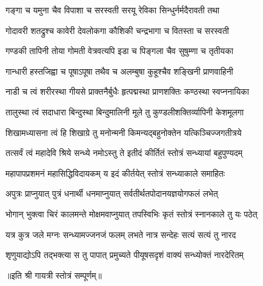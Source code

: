 \twolineshloka
{गङ्गा च यमुना चैव विपाशा च सरस्वती}
{सरयू रेविका सिन्धुर्नर्मदैरावती तथा}

\twolineshloka
{गोदावरी शतद्रुश्च कावेरी देवलोकगा}
{कौशिकी चन्द्रभागा च वितस्ता च सरस्वती}

\twolineshloka
{गण्डकी तापिनी तोया गोमती वेत्रवत्यपि}
{इडा च पिङ्गला चैव सुषुम्णा च तृतीयका}

\twolineshloka
{गान्धारी हस्तजिह्वा च पूषाऽपूषा तथैव च}
{अलम्बुषा कुहूश्चैव शङ्खिनी प्राणवाहिनी}

\twolineshloka
{नाडी च त्वं शरीरस्था गीयसे प्राक्तनैर्बुधैः}
{हृत्पद्मस्था प्राणशक्तिः कण्ठस्था स्वप्ननायिका}

\twolineshloka
{तालुस्था त्वं सदाधारा बिन्दुस्था बिन्दुमालिनी}
{मूले तु कुण्डलीशक्तिर्व्यापिनी केशमूलगा}

\twolineshloka
{शिखामध्यासना त्वं हि शिखाग्रे तु मनोन्मनी}
{किमन्यद्बहुनोक्तेन यत्किञ्चिज्जगतीत्रये}

\twolineshloka
{तत्सर्वं त्वं महादेवि श्रिये सन्ध्ये नमोऽस्तु ते}
{इतीदं कीर्तितं स्तोत्रं सन्ध्यायां बहुपुण्यदम्}

\twolineshloka
{महापापप्रशमनं महासिद्धिविदायकम्}
{य इदं कीर्तयेत् स्तोत्रं सन्ध्याकाले समाहितः}

\twolineshloka
{अपुत्रः प्राप्नुयात् पुत्रं धनार्थी धनमाप्नुयात्}
{सर्वतीर्थतपोदानयज्ञयोगफलं लभेत्}

\twolineshloka
{भोगान् भुक्त्वा चिरं कालमन्ते मोक्षमवाप्नुयात्}
{तपस्विभिः कृतं स्तोत्रं स्नानकाले तु यः पठेत्}

\twolineshloka
{यत्र कुत्र जले मग्नः सन्ध्यामज्जनजं फलम्}
{लभते नात्र सन्देहः सत्यं सत्यं तु नारद}

\twolineshloka
{शृणुयाद्योऽपि तद्भक्त्या स तु पापात् प्रमुच्यते}
{पीयूषसदृशं वाक्यं सन्ध्योक्तं नारदेरितम्}

॥इति श्री गायत्री स्तोत्रं सम्पूर्णम्॥
